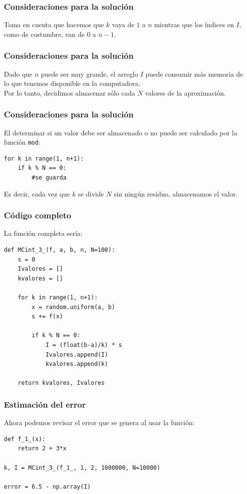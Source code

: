 \documentclass[12pt]{beamer}
\begin{document}
\begin{frame}
\frametitle{Consideraciones para la solución}
Toma en cuenta que hacemos que $k$ vaya de $1$ a $n$ mientras que los índices en $I$, como de costumbre, van de $0$ a $n-1$.
\end{frame}
\begin{frame}
\frametitle{Consideraciones para la solución}
Dado que $n$ puede ser muy grande, el arreglo $I$ puede consumir más memoria de lo que tenemos disponible en la computadora.
\\
\bigskip
\pause
Por lo tanto, decidimos almacenar sólo cada $N$ valores de la aproximación. 
\end{frame}
\begin{frame}
\frametitle{Consideraciones para la solución}
El determinar si un valor debe ser almacenado o no puede ser calculado por la función \texttt{mod}:
\begin{lstlisting}[caption=Almacenamiento de valores, style=FormattedNumber, basicstyle=\linespread{1.1}\ttfamily=\small, columns=fullflexible]
for k in range(1, n+1):
    if k % N == 0:
    	#se guarda
\end{lstlisting}
Es decir, cada vez que $k$ se divide $N$ sin ningún residuo, almacenamos el valor.
\end{frame}
\begin{frame}
\frametitle{Código completo}
La función completa sería:
\begin{lstlisting}[caption=Código completo para el ejercicio, style=FormattedNumber, basicstyle=\linespread{1.1}\ttfamily=\small, columns=fullflexible]
def MCint_3_(f, a, b, n, N=100):
    s = 0
    Ivalores = []
    kvalores = []
    
    for k in range(1, n+1):
        x = random.uniform(a, b)
        s += f(x)

        if k % N == 0:
            I = (float(b-a)/k) * s
            Ivalores.append(I)
            kvalores.append(k)
    
    return kvalores, Ivalores
\end{lstlisting}
\end{frame}
\begin{frame}
\frametitle{Estimación del error}
Ahora podemos revisar el error que se genera al usar la función:
\begin{lstlisting}[caption=Estimación del error del procedimiento, style=FormattedNumber, basicstyle=\linespread{1.1}\ttfamily=\small, columns=fullflexible]
def f_1_(x):
    return 2 + 3*x

k, I = MCint_3_(f_1_, 1, 2, 1000000, N=10000)

error = 6.5 - np.array(I)
\end{lstlisting}
\end{frame}
\end{document}
